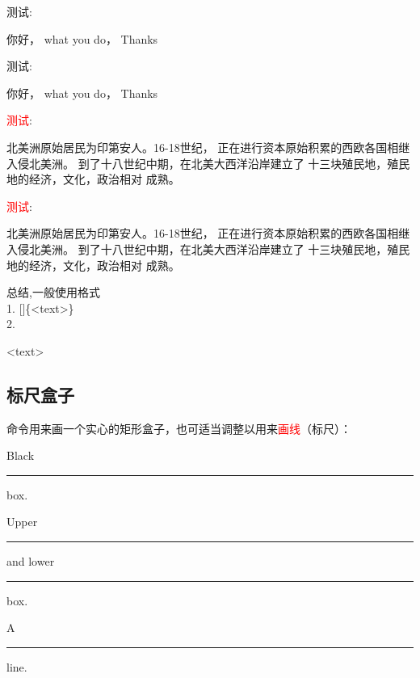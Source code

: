 \documentclass[fontset=windows]{article}
\begin{document}
\vspace*{4em}
\begin{example}
    测试:\parbox[t][2em][r]{4em}%
        {你好， what you do， Thanks}    
\end{example}


\vspace*{4em}
\begin{example}
    测试:\parbox[t]{4em}%
        {你好， what you do， Thanks}    
\end{example}

\vspace*{4em}
\begin{example}
\end{example}

\vspace*{4em}
\begin{example}
        \textcolor{red}{测试}:\parbox[t]{8em}%
        {北美洲原始居民为印第安人。16-18世纪，
        正在进行资本原始积累的西欧各国相继入侵北美洲。
        到了十八世纪中期，在北美大西洋沿岸建立了
        十三块殖民地，殖民地的经济，文化，政治相对
        成熟。}  
\end{example}


\vspace*{4em}
\begin{example}
    \textcolor{red}{测试}:\parbox[b]{8em}%
        {北美洲原始居民为印第安人。16-18世纪，
        正在进行资本原始积累的西欧各国相继入侵北美洲。
        到了十八世纪中期，在北美大西洋沿岸建立了
        十三块殖民地，殖民地的经济，文化，政治相对
        成熟。}  
\end{example}

{
    \kaishu 
    总结,一般使用格式\\
    1. []\{<text>\}\\
    2.\\
    \par
    \par
    \par
    \par
    \par
    <text>\\
}

\subsection{标尺盒子}
 命令用来画一个实心的矩形盒子，也可适当调整以用来\textcolor{red}{画线}（标尺）：
\begin{command}
\end{command}
\begin{example}
Black \rule{12pt}{4pt} box.

Upper \rule[4pt]{6pt}{8pt} and
lower \rule[-4pt]{6pt}{8pt} box.

A \rule[-.4pt]{3em}{.4pt} line.
\end{example}
\end{document}
